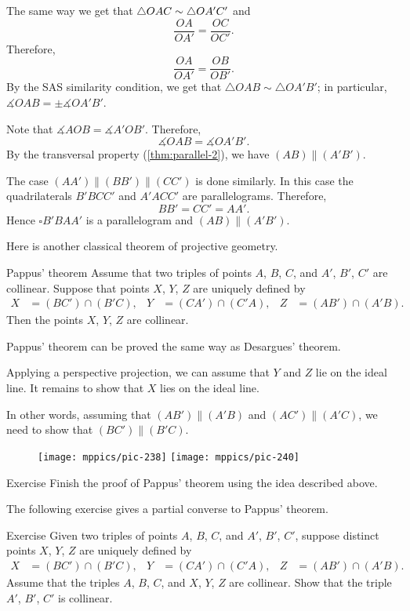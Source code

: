 The same way we get that $\triangle OAC\z\sim\triangle OA'C'$ and
\[\frac{OA}{OA'}=\frac{OC}{OC'}.\]
Therefore, 
\[\frac{OA}{OA'}=\frac{OB}{OB'}.\]
By the SAS similarity condition, 
we get that $\triangle OAB\sim\triangle OA'B'$;
in particular, $\measuredangle OAB=\pm\measuredangle OA'B'$.

Note that $\measuredangle AOB=\measuredangle A'OB'$.
Therefore, 
\[\measuredangle OAB=\measuredangle OA'B'.\]
By the transversal property (\ref{thm:parallel-2}), we have
$(AB)\parallel (A'B')$.

The case $(AA')\parallel(BB')\parallel(CC')$ is done similarly.
In this case the quadrilaterals $B'BCC'$ and $A'ACC'$ are parallelograms.
Therefore, 
\[BB'=CC'=AA'.\]
Hence $\square B'BAA'$ is a parallelogram and $(AB)\parallel (A'B')$.
\qeds

Here is another classical theorem of projective geometry.

\begin{thm}{Pappus' theorem}\label{thm:pappus}
Assume that two triples of points $A$, $B$, $C$,
and $A'$, $B'$, $C'$ are collinear.
Suppose that points $X$, $Y$, $Z$ are uniquely defined by
\begin{align*}
X&=(BC')\cap(B'C),
&
Y&=(CA')\cap(C'A),
&
Z&=(AB')\cap(A'B).
\end{align*}
Then the points $X$, $Y$, $Z$ are collinear.
\end{thm}

Pappus' theorem can be proved the same way as Desargues' theorem.

Applying a perspective projection, we can assume that $Y$ and $Z$ lie on the ideal line.
It remains to show that $X$ lies on the ideal line.

In other words, assuming that $(AB')\parallel (A'B)$ and $(AC')\parallel (A'C)$, we need to show that $(BC')\parallel(B'C)$.

\begin{figure}[h!]
\centering
\texttt{[image: mppics/pic-238]}
\hskip15mm
\texttt{[image: mppics/pic-240]}
\end{figure}


\begin{thm}{Exercise}\label{ex:pappus}
Finish the proof of Pappus' theorem using the idea described above.
\end{thm}

The following exercise gives a partial converse to Pappus' theorem.

\begin{thm}{Exercise}\label{ex:pappus-converse}
Given two triples of points $A$, $B$, $C$,
and $A'$, $B'$, $C'$,
suppose distinct points $X$, $Y$, $Z$ are uniquely defined by
\begin{align*}
X&=(BC')\cap(B'C),
&
Y&=(CA')\cap(C'A),
&
Z&=(AB')\cap(A'B).
\end{align*}
Assume that the triples $A$, $B$, $C$,
and $X$, $Y$, $Z$ are collinear.
Show that the triple $A'$, $B'$, $C'$ is collinear.
\end{thm}

